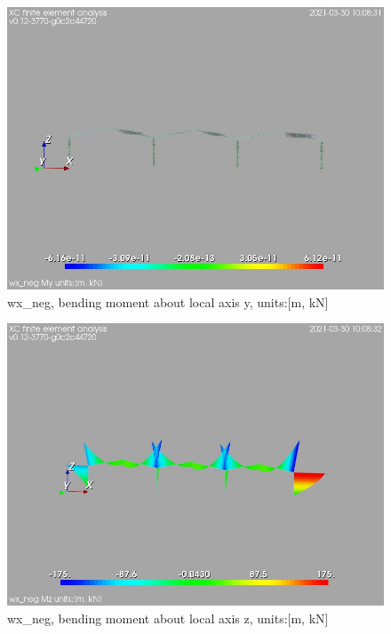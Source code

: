 \begin{figure}
\begin{center}
\includegraphics[width=\linewidth]{calc_results/sole_zeinali/text/graphics/resSimplLC/wx_negallMemberSetMy}
\caption{wx_neg, bending moment about local axis y, units:[m, kN]}
\end{center}
\end{figure}
\begin{figure}
\begin{center}
\includegraphics[width=\linewidth]{calc_results/sole_zeinali/text/graphics/resSimplLC/wx_negallMemberSetMz}
\caption{wx_neg, bending moment about local axis z, units:[m, kN]}
\end{center}
\end{figure}
